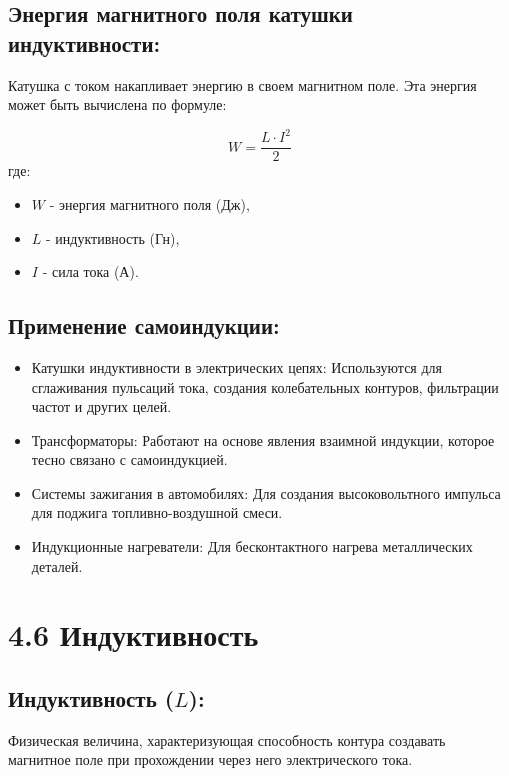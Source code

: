 \documentclass[a4paper,12pt]{article}
\begin{document}
\vspace{-9pt}
\subsection*{Энергия магнитного поля катушки индуктивности:}
\vspace{-3pt}
Катушка с током накапливает энергию в своем магнитном поле. Эта энергия может быть вычислена по формуле:

\vspace{-0.05em}
$$ W = \frac{L \cdot I^2}{2} $$
где:
\begin{itemize}
  \item $W$ - энергия магнитного поля (Дж),
  \item $L$ - индуктивность (Гн),
  \item $I$ - сила тока (А).
\end{itemize}

\vspace{-9pt}
\subsection*{Применение самоиндукции:}
\vspace{-3pt}
\begin{itemize}
  \item Катушки индуктивности в электрических цепях: Используются для сглаживания пульсаций тока, создания колебательных контуров, фильтрации частот и других целей.
  \item Трансформаторы: Работают на основе явления взаимной индукции, которое тесно связано с самоиндукцией.
  \item Системы зажигания в автомобилях: Для создания высоковольтного импульса для поджига топливно-воздушной смеси.
  \item Индукционные нагреватели: Для бесконтактного нагрева металлических деталей.
\end{itemize}

\newpage

\section*{4.6 Индуктивность}
\vspace{-9pt}
\subsection*{Индуктивность ($L$):}
\vspace{-3pt}
Физическая величина, характеризующая способность контура создавать магнитное поле при прохождении через него электрического тока.
\end{document}
